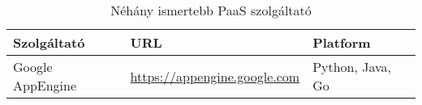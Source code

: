 \begin{table}[h]
	\caption{Néhány ismertebb PaaS szolgáltató}
	\centering
	\small
	\begin{tabular}{| p{4cm} | p{4cm} | p{4cm} |}
		\hline
		\rowcolor{MyTableColor} \textbf{Szolgáltató} & \textbf{URL} & \textbf{Platform} \\
		\hline
		Google AppEngine & \href{https://appengine.google.com}{https://appengine.google.com} & Python, Java, Go \\ 
		\hline
	\end{tabular}
	\normalsize
	\label{tab:paas_providers}
\end{table}